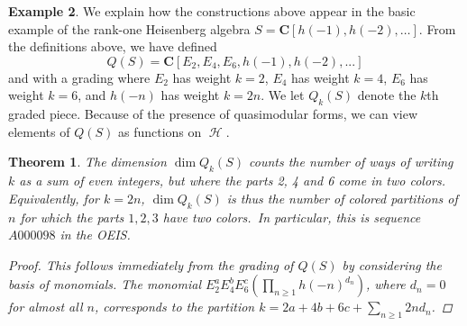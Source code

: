 \documentclass[12pt]{amsart}
\theoremstyle{plain}
\newtheorem{thm}{Theorem}[section]
\theoremstyle{definition}
\newtheorem{ex}[thm]{Example}
\theoremstyle{remark}
\DeclareMathOperator{\uhp}{\mathcal{H}}
\newcommand{\CC}{\mathbf{C}}
\begin{document}
\begin{ex}
We explain how the constructions above appear in the basic example of the rank-one Heisenberg algebra $S = \CC[h(-1),h(-2),\ldots]$. From the definitions above, we have defined 
\[Q(S)=\CC[E_2,E_4,E_6,h(-1),h(-2),...]\] 
and with a grading where $E_2$ has weight $k=2$, $E_4$ has weight $k=4$, $E_6$ has weight $k=6$, and $h(-n)$ has weight $k=2n$. We let $Q_k(S)$ denote the $k$th graded piece. Because of the presence of quasimodular forms, we can view elements of $Q(S)$ as functions on $\uhp$.
\begin{thm}
        The dimension $\dim Q_k(S)$ counts the number of ways of writing $k$ as a sum of even integers, but where the parts 2, 4 and 6 come in two colors. Equivalently, for $k=2n$, $\dim Q_k(S)$ is thus the number of colored partitions of $n$ for which the parts $1, 2, 3$ have two colors.\ In particular, this is sequence $A000098$ in the OEIS.
        \begin{proof}
            This follows immediately from the grading of $Q(S)$ by considering the basis of monomials. The monomial $E_2^aE_4^bE_6^c (\prod_{n\geq 1} h(-n)^{d_n})$, where $d_n = 0$ for almost all $n$, corresponds to the partition $k= 2a+4b+6c+\sum_{n\geq 1} 2nd_n$.
        \end{proof}
    \end{thm}


\end{ex}
\end{document}
